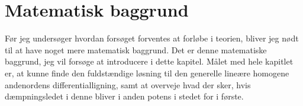 \chapter{Matematisk baggrund}
Før jeg undersøger hvordan forsøget forventes at forløbe i teorien, bliver jeg nødt til at have noget mere matematisk baggrund. 
Det er denne matematiske baggrund, jeg vil forsøge at introducere i dette kapitel. 
Målet med hele kapitlet er, at kunne finde den fuldstændige løsning til den generelle lineære homogene andenordens differentialligning, samt at overveje hvad der sker, hvis dæmpningsledet i denne bliver i anden potens i stedet for i første. 